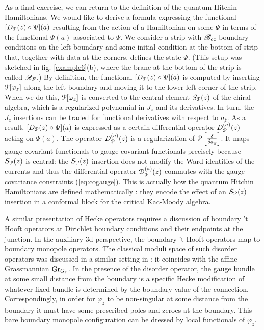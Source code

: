 \documentclass[11pt,a4paper]{article}
\begin{document}
As a final exercise, we can return to the definition of the quantum Hitchin Hamiltonians. We would 
like to derive a formula expressing the functional $[\D_\P(z) \circ \Psi](a)$ resulting from the action of a
Hamiltonian on some $\Psi$ in terms of  the functional $\Psi(a)$ associated to $\Psi$. We consider a strip with $\B_\cc$ boundary conditions on the left boundary and some initial condition at the
bottom of strip that, together with data at the corners, defines the state $\Psi$.  (This setup was sketched in fig. \ref{example6}(b), where the brane at the bottom
of the strip is called $\B_F$.)
By definition, the functional 
$[\D_\P(z) \circ \Psi](a)$ is computed by inserting $\P[\varphi_z]$ along the left boundary and moving it to the lower left corner of
the strip.    When we do this,  $\P[\varphi_z]$ is converted to 
the central element $S_{\P}(z)$ of the chiral algebra, which is a regularized polynomial in $J_z$ and its derivatives. In turn, 
the $J_z$ insertions can be traded for functional derivatives with respect to $a_{\bar z}$. 
As a result, $[\D_\P(z) \circ \Psi](a)$ is expressed as a certain differential operator $\D^{(a)}_\P(z)$ acting on $\Psi(a)$. The operator 
 $\D^{(a)}_\P(z)$ is a regularization of $\P\left[\frac{\delta}{\delta a_{\bar z}} \right]$. It maps gauge-covariant functionals to 
 gauge-covariant functionals precisely because $S_{\P}(z)$ is central: the $S_{\P}(z)$ insertion does not modify the 
 Ward identities of the currents and thus the differential operator ${\cal D}^{(a)}_{\P}(z)$ commutes with the 
 gauge-covariance constraints (\ref{eq:cogauge}). This is actually how the quantum Hitchin Hamiltonians 
 are defined mathematically \cite{BD}: they encode the effect of an $S_{\P}(z)$ insertion in a conformal block
 for the critical Kac-Moody algebra. 

A similar presentation of Hecke operators requires a discussion of boundary 't Hooft operators 
at Dirichlet boundary conditions and  their endpoints at the junction. In the auxiliary 3d perspective, 
the boundary 't Hooft operators map to boundary monopole operators. The classical moduli space of such disorder operators 
was discussed in a similar setting in \cite{Costello:2020ndc}: it coincides with the affine Grassmannian $\Gr_{G_\C}$. 
In the presence of the disorder operator, the gauge bundle at some small distance from the boundary is a specific Hecke modification 
of whatever fixed bundle is determined by the boundary value of the connection. Correspondingly, in order for $\varphi_z$  
to be non-singular at some distance from the boundary it must have some prescribed poles and zeroes at the boundary. 
This bare boundary monopole configuration can be dressed by local functionals of $\varphi_z$. 
\end{document}
